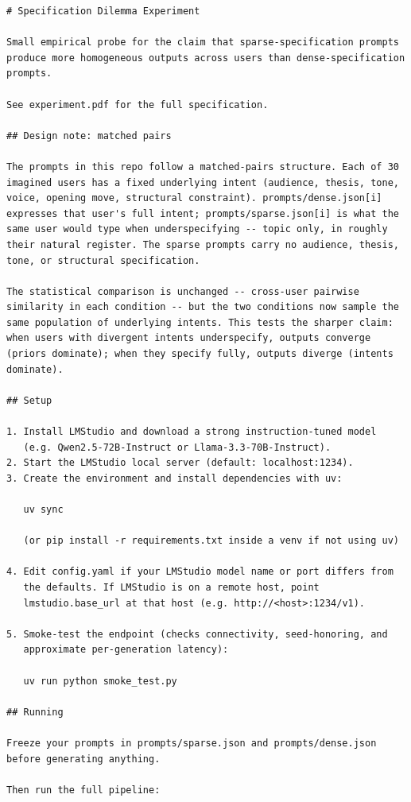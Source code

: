 \documentclass[11pt]{article}
\begin{document}
\begin{lstlisting}[style=yamlstyle,language={}]
# Specification Dilemma Experiment

Small empirical probe for the claim that sparse-specification prompts
produce more homogeneous outputs across users than dense-specification
prompts.

See experiment.pdf for the full specification.

## Design note: matched pairs

The prompts in this repo follow a matched-pairs structure. Each of 30
imagined users has a fixed underlying intent (audience, thesis, tone,
voice, opening move, structural constraint). prompts/dense.json[i]
expresses that user's full intent; prompts/sparse.json[i] is what the
same user would type when underspecifying -- topic only, in roughly
their natural register. The sparse prompts carry no audience, thesis,
tone, or structural specification.

The statistical comparison is unchanged -- cross-user pairwise
similarity in each condition -- but the two conditions now sample the
same population of underlying intents. This tests the sharper claim:
when users with divergent intents underspecify, outputs converge
(priors dominate); when they specify fully, outputs diverge (intents
dominate).

## Setup

1. Install LMStudio and download a strong instruction-tuned model
   (e.g. Qwen2.5-72B-Instruct or Llama-3.3-70B-Instruct).
2. Start the LMStudio local server (default: localhost:1234).
3. Create the environment and install dependencies with uv:

   uv sync

   (or pip install -r requirements.txt inside a venv if not using uv)

4. Edit config.yaml if your LMStudio model name or port differs from
   the defaults. If LMStudio is on a remote host, point
   lmstudio.base_url at that host (e.g. http://<host>:1234/v1).

5. Smoke-test the endpoint (checks connectivity, seed-honoring, and
   approximate per-generation latency):

   uv run python smoke_test.py

## Running

Freeze your prompts in prompts/sparse.json and prompts/dense.json
before generating anything.

Then run the full pipeline:


\end{lstlisting}
\end{document}
